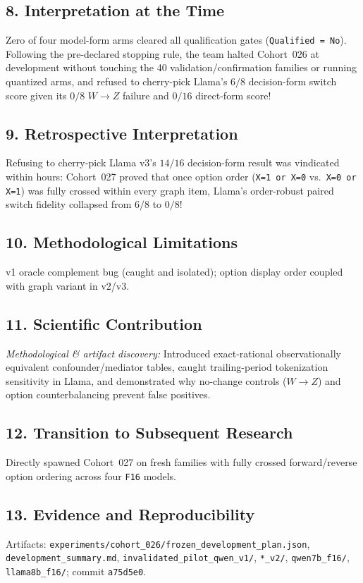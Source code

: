 \subsection*{8. Interpretation at the Time}
Zero of four model-form arms cleared all qualification gates (\texttt{Qualified = No}). Following the pre-declared stopping rule, the team halted Cohort~026 at development without touching the 40 validation/confirmation families or running quantized arms, and refused to cherry-pick Llama's $6/8$ decision-form switch score given its $0/8$ $W\to Z$ failure and $0/16$ direct-form score!

\subsection*{9. Retrospective Interpretation}
Refusing to cherry-pick Llama v3's $14/16$ decision-form result was vindicated within hours: Cohort~027 proved that once option order (\texttt{X=1 or X=0} vs.\ \texttt{X=0 or X=1}) was fully crossed within every graph item, Llama's order-robust paired switch fidelity collapsed from $6/8$ to \textbf{$0/8$}!

\subsection*{10. Methodological Limitations}
v1 oracle complement bug (caught and isolated); option display order coupled with graph variant in v2/v3.

\subsection*{11. Scientific Contribution}
\emph{Methodological \& artifact discovery:} Introduced exact-rational observationally equivalent confounder/mediator tables, caught trailing-period tokenization sensitivity in Llama, and demonstrated why no-change controls ($W\to Z$) and option counterbalancing prevent false positives.

\subsection*{12. Transition to Subsequent Research}
Directly spawned Cohort~027 on fresh families with fully crossed forward/reverse option ordering across four \texttt{F16} models.

\subsection*{13. Evidence and Reproducibility}
Artifacts: \texttt{experiments/cohort\_026/frozen\_development\_plan.json}, \texttt{development\_summary.md}, \texttt{invalidated\_pilot\_qwen\_v1/}, \texttt{*\_v2/}, \texttt{qwen7b\_f16/}, \texttt{llama8b\_f16/}; commit \texttt{a75d5e0}.

